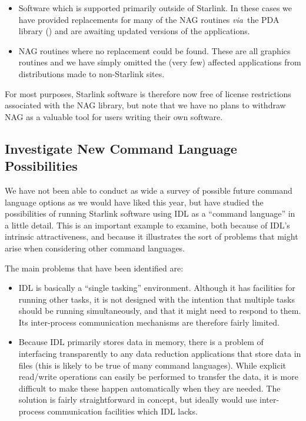 \begin{itemize}
\item Software which is supported primarily outside of Starlink. In
these cases we have provided replacements for many of the NAG routines
{\em via}\ the PDA library () and are awaiting
updated versions of the applications.

\item NAG routines where no replacement could be found. These are all
graphics routines and we have simply omitted the (very few) affected
applications from distributions made to non-Starlink sites.
\end{itemize}

For most purposes, Starlink software is therefore now free of license
restrictions associated with the NAG library, but note that we have no
plans to withdraw NAG as a valuable tool for users writing their own
software.

\subsection{Investigate New Command Language Possibilities}

We have not been able to conduct as wide a survey of possible future
command language options as we would have liked this year, but have
studied the possibilities of running Starlink software using IDL as a
``command language'' in a little detail. This is an important example
to examine, both because of IDL's intrinsic attractiveness, and
because it illustrates the sort of problems that might arise when
considering other command languages.

The main problems that have been identified are:

\begin{itemize}
\item IDL is basically a ``single tasking'' environment. Although it
has facilities for running other tasks, it is not designed with the
intention that multiple tasks should be running simultaneously, and
that it might need to respond to them. Its inter-process communication
mechanisms are therefore fairly limited.

\item Because IDL primarily stores data in memory, there is a problem
of interfacing transparently to any data reduction applications that
store data in files (this is likely to be true of many command
languages). While explicit read/write operations can easily be
performed to transfer the data, it is more difficult to make these
happen automatically when they are needed.  The solution is fairly
straightforward in concept, but ideally would use inter-process
communication facilities which IDL lacks.
\end{itemize}

